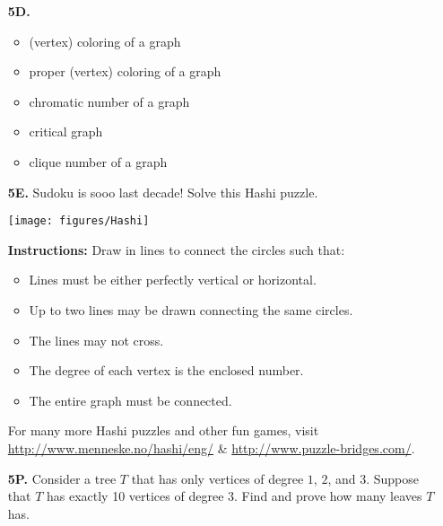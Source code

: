 \documentclass[12pt]{article}
\begin{document}
\begin{enumerate}
\item[\bf 5D.]  

\begin{itemize}
\item (vertex) coloring of a graph 
\item proper (vertex) coloring of a graph
\item chromatic number of a graph
\item critical graph
\item clique number of a graph
\end{itemize}


\item[\bf 5E.]
Sudoku is sooo last decade! Solve this Hashi puzzle.

\begin{center}
\texttt{[image: figures/Hashi]}
\end{center}
{\bf Instructions:}  Draw in lines to connect the circles such that:
\begin{itemize}
\item Lines must be either perfectly vertical or horizontal.
\item Up to two lines may be drawn connecting the same circles.  
\item The lines may not cross.
\item The degree of each vertex is the enclosed number.  
\item The entire graph must be connected.
\end{itemize}
For many more Hashi puzzles and other fun games, visit \newline\url{http://www.menneske.no/hashi/eng/} \& \url{http://www.puzzle-bridges.com/}.



\item[\bf 5P.] 
Consider a tree $T$ that has only vertices of degree $1$, $2$, and $3$.  Suppose that $T$ has exactly 10 vertices of degree $3$.  Find and prove how many leaves $T$ has.    

\end{enumerate}
\end{document}

